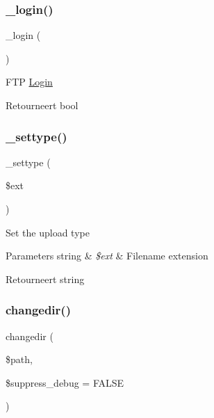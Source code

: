 \subsubsection{\texorpdfstring{\_login()}{\_login()}}
{\footnotesize\ttfamily \+\_\+login (\begin{DoxyParamCaption}{ }\end{DoxyParamCaption})\hspace{0.3cm}{\ttfamily [protected]}}

F\+TP \mbox{\hyperlink{class_login}{Login}}

\begin{DoxyReturn}{Retourneert}
bool 
\end{DoxyReturn}
\mbox{\label{class_c_i___f_t_p_aacd9d6628615078d8df9aab1fe70e391}} 
\subsubsection{\texorpdfstring{\_settype()}{\_settype()}}
{\footnotesize\ttfamily \+\_\+settype (\begin{DoxyParamCaption}\item[{}]{\$ext }\end{DoxyParamCaption})\hspace{0.3cm}{\ttfamily [protected]}}

Set the upload type


\begin{DoxyParams}[1]{Parameters}
string & {\em \$ext} & Filename extension \\
\hline
\end{DoxyParams}
\begin{DoxyReturn}{Retourneert}
string 
\end{DoxyReturn}
\mbox{\label{class_c_i___f_t_p_a81098bf710d7879da8d69130f136475b}} 
\subsubsection{\texorpdfstring{changedir()}{changedir()}}
{\footnotesize\ttfamily changedir (\begin{DoxyParamCaption}\item[{}]{\$path,  }\item[{}]{\$suppress\+\_\+debug = {\ttfamily FALSE} }\end{DoxyParamCaption})}

